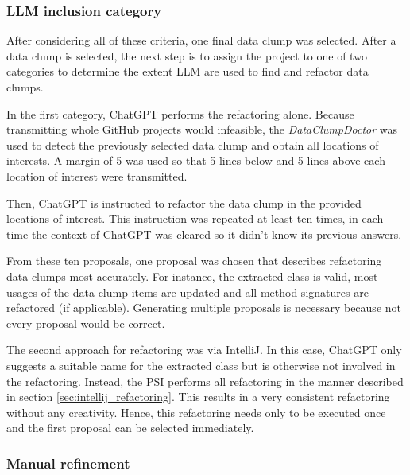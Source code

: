 \subsubsection{LLM inclusion category}

After considering all of these criteria, one final data clump was selected.
After a data clump is selected, the next step is to assign the project to one of two categories to determine the extent \acs{LLM} are used to find and refactor data clumps. 



In the first category, ChatGPT performs the refactoring alone. Because transmitting whole GitHub projects would infeasible, the \textit{DataClumpDoctor} was used to detect the previously selected data clump and obtain all locations of interests. A margin of 5 was used so that 5 lines below and 5 lines above each location of interest were transmitted. 

Then, ChatGPT is instructed to refactor the data clump in the provided locations of interest. This instruction was repeated at least ten times, in each time the context of ChatGPT was cleared so it didn't know its previous answers. 

From these ten proposals, one proposal was chosen that describes refactoring data clumps most accurately. For instance, the extracted class is valid, most usages of the data clump items are updated and all method signatures are refactored (if applicable). Generating multiple proposals is necessary because not every proposal would be correct. 



The second approach for refactoring was via IntelliJ. In this case, ChatGPT only suggests a suitable name for the extracted class but is otherwise not involved in the refactoring. Instead, the \ac{PSI} performs all refactoring in the manner described in section  \ref{sec:intellij_refactoring}. This results in a very consistent refactoring without any creativity. Hence, this refactoring needs only to be executed once and the first proposal can be selected immediately. 

\subsubsection{Manual refinement}

